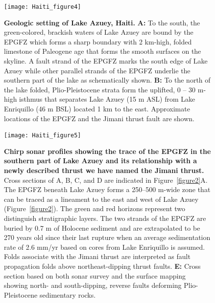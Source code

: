 \documentclass[linenumbers,draft]{agujournal}
\begin{document}
\begin{figure}
\centering
\texttt{[image: Haiti\_figure4]}
\caption{\textbf{Geologic setting of Lake Azuey, Haiti.} \textbf{A:} To the south, the green-colored, brackish waters of Lake Azuey are bound by the EPGFZ which forms a sharp boundary with 2 km-high, folded limestone of Paleogene age that forms the smooth surfaces on the skyline. A fault strand of the EPGFZ marks the south edge of Lake Azuey while other parallel strands of the EPGFZ underlie the southern part of the lake as schematically shown. \textbf{B:} To the north of the lake folded, Plio-Pleistocene strata form the uplifted, 0 -- 30 m-high isthmus that separates Lake Azuey (15 m ASL) from Lake Enriquillo (46 m BSL) located 1 km to the east. Approximate locations of the EPGFZ and the Jimani thrust fault are shown.}
\label{figure4}
\end{figure}

\begin{figure}
\centering
\texttt{[image: Haiti\_figure5]}
\caption{\textbf{Chirp sonar profiles showing the trace of the EPGFZ in the southern part of Lake Azuey and its relationship with a newly described thrust we have named the Jimani thrust.} Cross sections of A, B, C, and D are indicated in Figure~\ref{figure2}A. The EPGFZ beneath Lake Azuey forms a 250--500 m-wide zone that can be traced as a lineament to the east and west of Lake Azuey (Figure~\ref{figure2}). The green and red horizons represent two distinguish stratigraphic layers. The two strands of the EPGFZ are buried by 0.7 m of Holocene sediment and are extrapolated to be 270 years old since their last rupture when an average sedimentation rate of 2.6 mm/yr based on cores from Lake Enriquillo is assumed. Folds associate with the Jimani thrust are interpreted as fault propagation folds above northeast-dipping thrust faults. \textbf{E:} Cross section based on both sonar survey and the surface mapping \citep{mann1991overview} showing north- and south-dipping, reverse faults deforming Plio-Pleistocene sedimentary rocks.}
\label{figure5}
\end{figure}
\end{document}
